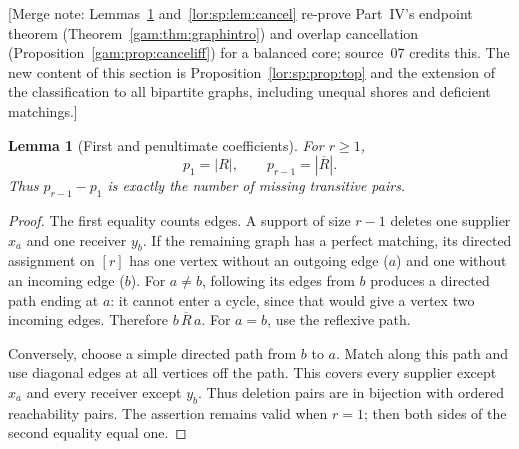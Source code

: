 \documentclass[11pt]{article}
\numberwithin{equation}{section}
\newtheorem{lemma}[theorem]{Lemma}
\theoremstyle{definition}
\begin{document}
[Merge note: Lemmas~\ref{lor:sp:lem:defect} and~\ref{lor:sp:lem:cancel} re-prove
Part~IV's endpoint theorem (Theorem~\ref{gam:thm:graphintro}) and overlap
cancellation (Proposition~\ref{gam:prop:canceliff}) for a balanced core;
source~07 credits this. The new content of this section is
Proposition~\ref{lor:sp:prop:top} and the extension of the classification to
all bipartite graphs, including unequal shores and deficient matchings.]
\begin{lemma}[First and penultimate coefficients]
\label{lor:sp:lem:defect}
For $r\ge1$,
\begin{equation}
 p_1=|R|,\qquad p_{r-1}=|\overline R|.
 \label{lor:sp:eq:defect}
\end{equation}
Thus $p_{r-1}-p_1$ is exactly the number of missing transitive pairs.
\end{lemma}
\begin{proof}
The first equality counts edges. A support of size $r-1$ deletes one supplier
$x_a$ and one receiver $y_b$. If the remaining graph has a perfect matching,
its directed assignment on $[r]$ has one vertex without an outgoing edge
($a$) and one without an incoming edge ($b$). For $a\ne b$, following its
edges from $b$ produces a directed path ending at $a$: it cannot enter a cycle,
since that would give a vertex two incoming edges. Therefore $b\,\overline R\,a$.
For $a=b$, use the reflexive path.

Conversely, choose a simple directed path from $b$ to $a$. Match along this
path and use diagonal edges at all vertices off the path. This covers every
supplier except $x_a$ and every receiver except $y_b$. Thus deletion pairs
are in bijection with ordered reachability pairs. The assertion remains valid
when $r=1$; then both sides of the second equality equal one.
\end{proof}
\end{document}

